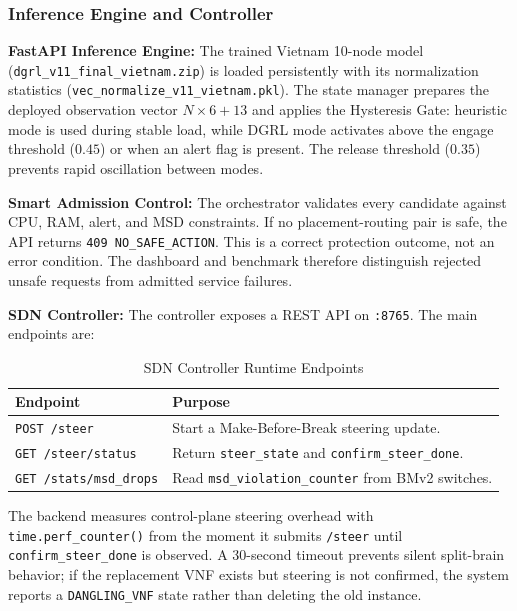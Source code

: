 \documentclass[12pt, a4paper, reqno, oneside]{book}
\begin{document}
\subsubsection{Inference Engine and Controller}
\textbf{FastAPI Inference Engine:} The trained Vietnam 10-node model (\texttt{dgrl\_v11\_final\_vietnam.zip}) is loaded persistently with its normalization statistics (\texttt{vec\_normalize\_v11\_vietnam.pkl}). The state manager prepares the deployed observation vector $N \times 6 + 13$ and applies the Hysteresis Gate: heuristic mode is used during stable load, while DGRL mode activates above the engage threshold ($0.45$) or when an alert flag is present. The release threshold ($0.35$) prevents rapid oscillation between modes.

\textbf{Smart Admission Control:} The orchestrator validates every candidate against CPU, RAM, alert, and MSD constraints. If no placement-routing pair is safe, the API returns \texttt{409 NO\_SAFE\_ACTION}. This is a correct protection outcome, not an error condition. The dashboard and benchmark therefore distinguish rejected unsafe requests from admitted service failures.

\textbf{SDN Controller:} The controller exposes a REST API on \texttt{:8765}. The main endpoints are:

\begin{table}[H]
\centering
\caption{SDN Controller Runtime Endpoints}
\label{table:sdn_endpoints}
\begin{tabular}{ll}
\toprule
\textbf{Endpoint} & \textbf{Purpose} \\
\midrule
\texttt{POST /steer} & Start a Make-Before-Break steering update. \\
\texttt{GET /steer/status} & Return \texttt{steer\_state} and \texttt{confirm\_steer\_done}. \\
\texttt{GET /stats/msd\_drops} & Read \texttt{msd\_violation\_counter} from BMv2 switches. \\
\bottomrule
\end{tabular}
\end{table}

The backend measures control-plane steering overhead with \texttt{time.perf\_counter()} from the moment it submits \texttt{/steer} until \texttt{confirm\_steer\_done} is observed. A 30-second timeout prevents silent split-brain behavior; if the replacement VNF exists but steering is not confirmed, the system reports a \texttt{DANGLING\_VNF} state rather than deleting the old instance.
\end{document}
